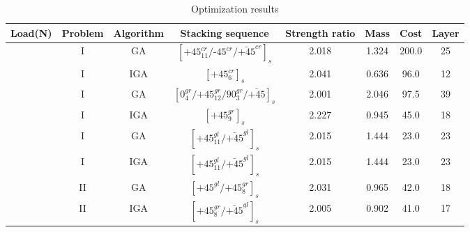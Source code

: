 \documentclass[Afour,sagev,times]{sagej}
\begin{document}
\begin{table}
	\small\sf\centering
	\caption{Optimization results} 
	\begin{tabular}{cccccccc}
	\toprule
	Load(N)                                                 &  Problem  &   Algorithm      & Stacking sequence                                    & Strength ratio  & Mass  &  Cost   & Layer    \\ 
	\midrule																								  
	  &  I  & GA   &  $[\text{+}45_{11}^{cr}/\text{-}45^{cr}/\bar{\text{+}45}^{cr}]_s$                            & 2.018           & 1.324 &  200.0  & 25  \\
	                                                                             &  I  & IGA  &  $[\text{+}45_{6}^{cr}]_s$                            & 2.041           & 0.636 &  96.0  & 12  \\

																				 &  I  & GA   &  $[0_4^{gr}/\text{+}45_{12}^{gr}/90_3^{gr}/\bar{\text{+}45}]_s$                            & 2.001           & 2.046 &  97.5  & 39  \\
																				 &  I  & IGA  &  $[\text{+}45_{9}^{gr}]_s$                            & 2.227           & 0.945 &  45.0  & 18  \\
																				 &  I  & GA   &  $[\text{+}45_{11}^{gl}/\bar{\text{+}45}^{gl}]_s$                            & 2.015           & 1.444 &  23.0  & 23  \\
																				 &  I  & IGA  &   $[\text{+}45_{11}^{gl}/\bar{\text{+}45}^{gl}]_s$                           & 2.015           & 1.444 &  23.0  & 23  \\
																				 &  II &  GA  &  $[\text{+}45^{gl}/\text{+}45_{8}^{gr}]_s$          & 2.031           & 0.965 &  42.0  & 18 \\
																				 &  II & IGA  &  $[\text{+}45_8^{gr}/\bar{\text{+}45}^{gl}]_s$          & 2.005           & 0.902 &  41.0  & 17 \\
	\bottomrule
\end{tabular}
\label{tab:NxNyNz}
\end{table}

\end{document}
